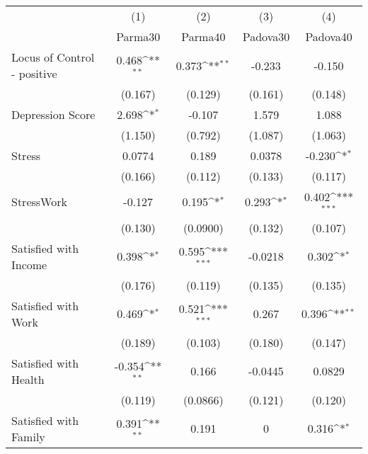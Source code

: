 {
\def\sym#1{\ifmmode^{#1}\else\(^{#1}\)\fi}
\begin{tabular}{l*{4}{c}}
\hline\hline
            &\multicolumn{1}{c}{(1)}&\multicolumn{1}{c}{(2)}&\multicolumn{1}{c}{(3)}&\multicolumn{1}{c}{(4)}\\
            &\multicolumn{1}{c}{Parma30}&\multicolumn{1}{c}{Parma40}&\multicolumn{1}{c}{Padova30}&\multicolumn{1}{c}{Padova40}\\
\hline
Locus of Control - positive&       0.468\sym{**} &       0.373\sym{**} &      -0.233         &      -0.150         \\
            &     (0.167)         &     (0.129)         &     (0.161)         &     (0.148)         \\
[1em]
Depression Score&       2.698\sym{*}  &      -0.107         &       1.579         &       1.088         \\
            &     (1.150)         &     (0.792)         &     (1.087)         &     (1.063)         \\
[1em]
Stress      &      0.0774         &       0.189         &      0.0378         &      -0.230\sym{*}  \\
            &     (0.166)         &     (0.112)         &     (0.133)         &     (0.117)         \\
[1em]
StressWork  &      -0.127         &       0.195\sym{*}  &       0.293\sym{*}  &       0.402\sym{***}\\
            &     (0.130)         &    (0.0900)         &     (0.132)         &     (0.107)         \\
[1em]
Satisfied with Income&       0.398\sym{*}  &       0.595\sym{***}&     -0.0218         &       0.302\sym{*}  \\
            &     (0.176)         &     (0.119)         &     (0.135)         &     (0.135)         \\
[1em]
Satisfied with Work&       0.469\sym{*}  &       0.521\sym{***}&       0.267         &       0.396\sym{**} \\
            &     (0.189)         &     (0.103)         &     (0.180)         &     (0.147)         \\
[1em]
Satisfied with Health&      -0.354\sym{**} &       0.166         &     -0.0445         &      0.0829         \\
            &     (0.119)         &    (0.0866)         &     (0.121)         &     (0.120)         \\
[1em]
Satisfied with Family&       0.391\sym{**} &       0.191         &           0         &       0.316\sym{*}  \\

\end{tabular}}
